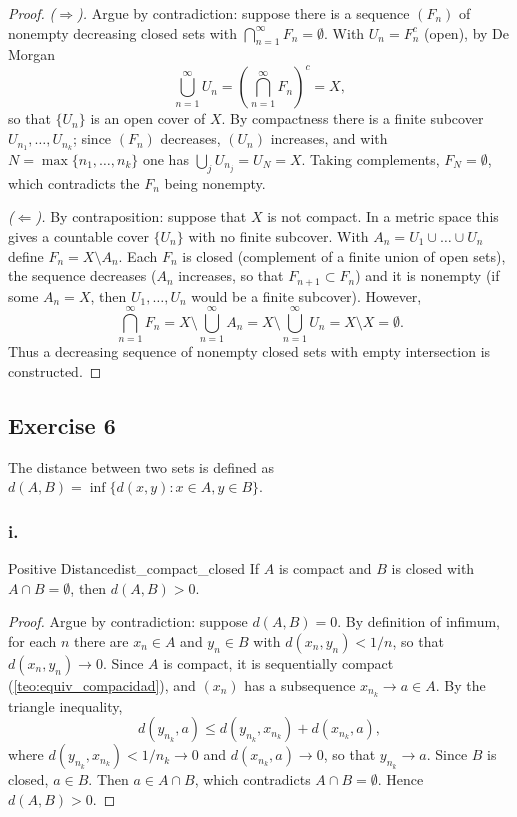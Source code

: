\documentclass[11pt, a4paper]{article}
\begin{document}
\begin{proof}
\textit{($\Rightarrow$).} Argue by contradiction: suppose there is a sequence $(F_n)$ of nonempty
decreasing closed sets with $\bigcap_{n=1}^{\infty} F_n = \emptyset$. With $U_n = F_n^c$ (open), by
De Morgan
$$ \bigcup_{n=1}^{\infty} U_n = \left( \bigcap_{n=1}^{\infty} F_n \right)^c = X, $$
so that $\{U_n\}$ is an open cover of $X$. By compactness there is a finite subcover
$U_{n_1}, \dots, U_{n_k}$; since $(F_n)$ decreases, $(U_n)$ increases, and with $N = \max\{n_1, \dots, n_k\}$ one
has $\bigcup_j U_{n_j} = U_N = X$. Taking complements, $F_N = \emptyset$, which contradicts
the $F_n$ being nonempty.

\textit{($\Leftarrow$).} By contraposition: suppose that $X$ is not compact. In a metric
space this gives a countable cover $\{U_n\}$ with no finite subcover. With
$A_n = U_1 \cup \dots \cup U_n$ define $F_n = X \setminus A_n$. Each $F_n$ is closed (complement
of a finite union of open sets), the sequence decreases ($A_n$ increases, so that $F_{n+1} \subset F_n$) and it is
nonempty (if some $A_n = X$, then $U_1, \dots, U_n$ would be a finite subcover). However,
$$ \bigcap_{n=1}^{\infty} F_n = X \setminus \bigcup_{n=1}^{\infty} A_n = X \setminus
\bigcup_{n=1}^{\infty} U_n = X \setminus X = \emptyset. $$
Thus a decreasing sequence of nonempty closed sets with empty intersection is constructed.
\end{proof}

\subsection*{Exercise 6}

The distance between two sets is defined as $d(A, B) = \inf \{ d(x, y) : x \in A, y \in B \}$.

\subsubsection*{i.}
\begin{proposicion}{Positive Distance}{dist_compact_closed}
If $A$ is compact and $B$ is closed with $A \cap B = \emptyset$, then $d(A, B) > 0$.
\end{proposicion}

\begin{proof}
Argue by contradiction: suppose $d(A, B) = 0$. By definition of infimum, for each $n$ there are
$x_n \in A$ and $y_n \in B$ with $d(x_n, y_n) < 1/n$, so that $d(x_n, y_n) \to 0$. Since $A$ is compact,
it is sequentially compact (\ref{teo:equiv_compacidad}), and $(x_n)$ has a subsequence
$x_{n_k} \to a \in A$. By the
triangle inequality,
$$ d(y_{n_k}, a) \le d(y_{n_k}, x_{n_k}) + d(x_{n_k}, a), $$
where $d(y_{n_k}, x_{n_k}) < 1/n_k \to 0$ and $d(x_{n_k}, a) \to 0$, so that $y_{n_k} \to a$. Since
$B$ is closed, $a \in B$. Then $a \in A \cap B$, which contradicts $A \cap B = \emptyset$. Hence
$d(A, B) > 0$.
\end{proof}
\end{document}
